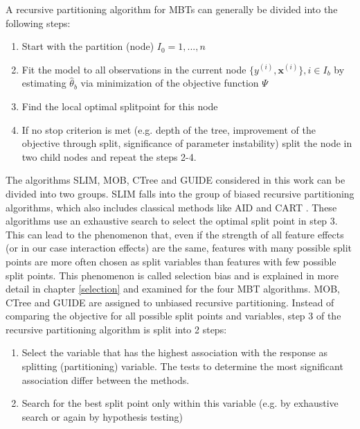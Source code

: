 A recursive partitioning algorithm for MBTs can generally be divided into the following steps:
\begin{enumerate}
    \item Start with the partition (node) $I_0 = 1,...,n$
    \item Fit the model to all observations in the current node $\{y^{(i)}, \mathbf{x}^{(i)}\}, i \in I_b$ by estimating $\hat{\theta}_b$ via minimization of the objective function $\Psi$
    \item Find the local optimal splitpoint for this node 
    \item If no stop criterion is met (e.g. depth of the tree, improvement of the objective through split, significance of parameter instability) split the node in two child nodes and repeat the steps 2-4.
\end{enumerate}


The algorithms SLIM, MOB, CTree and GUIDE considered in this work can be divided into two groups. SLIM falls into the group of biased recursive partitioning algorithms, which also includes classical methods like AID \citep{Morgan.1963} and CART \citep{Breiman.1984}. These algorithms use an exhaustive search to select the optimal split point in step 3. This can lead to the phenomenon that, even if the strength of all feature effects (or in our case interaction effects) are the same, features with many possible split points are more often chosen as split variables than features with few possible split points. This phenomenon is called selection bias and is explained in more detail in chapter \ref{selection} and examined for the four MBT algorithms.
MOB, CTree and GUIDE are assigned to unbiased recursive partitioning. Instead of comparing the objective for all possible split points and variables, step 3 of the recursive partitioning algorithm is split into 2 steps:

\begin{enumerate}
    \item Select the variable that has the highest association with the response as splitting (partitioning) variable. The tests to determine the most significant association differ between the methods.
    \item Search for the best split point only within this variable (e.g. by exhaustive search or again by hypothesis testing)
\end{enumerate}

\citep{Schlosser.2019}



